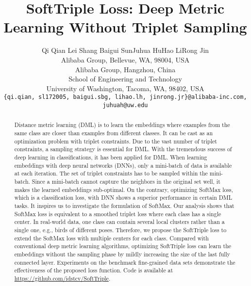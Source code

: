 \documentclass[10pt,twocolumn,letterpaper]{article}
\begin{document}
\title{SoftTriple Loss: Deep Metric Learning Without Triplet Sampling}

\author{Qi Qian \quad Lei Shang \quad Baigui Sun\quad Juhua Hu\quad Hao Li\quad Rong Jin\\
 Alibaba Group, Bellevue, WA, 98004, USA\\
 Alibaba Group, Hangzhou, China\\
 School of Engineering and Technology\\
University of Washington, Tacoma, WA, 98402, USA\\
{\tt\small \{qi.qian, sl172005, baigui.sbg, lihao.lh, jinrong.jr\}@alibaba-inc.com, juhuah@uw.edu}
}

\maketitle



\begin{abstract}
Distance metric learning (DML) is to learn the embeddings where examples from the same class are closer than examples from different classes. It can be cast as an optimization problem with triplet constraints. Due to the vast number of triplet constraints, a sampling strategy is essential for DML. With the tremendous success of deep learning in classifications, it has been applied for DML. When learning embeddings with deep neural networks (DNNs), only a mini-batch of data is available at each iteration. The set of triplet constraints has to be sampled within the mini-batch. Since a mini-batch cannot capture the neighbors in the original set well, it makes the learned embeddings sub-optimal. On the contrary, optimizing SoftMax loss, which is a classification loss, with DNN shows a superior performance in certain DML tasks. It inspires us to investigate the formulation of SoftMax. Our analysis shows that SoftMax loss is equivalent to a smoothed triplet loss where each class has a single center. In real-world data, one class can contain several local clusters rather than a single one, e.g., birds of different poses. Therefore, we propose the SoftTriple loss to extend the SoftMax loss with multiple centers for each class. Compared with conventional deep metric learning algorithms, optimizing SoftTriple loss can learn the embeddings without the sampling phase by mildly increasing the size of the last fully connected layer. Experiments on the benchmark fine-grained data sets demonstrate the effectiveness of the proposed loss function. Code is available at \url{https://github.com/idstcv/SoftTriple}.
\end{abstract}
\end{document}
